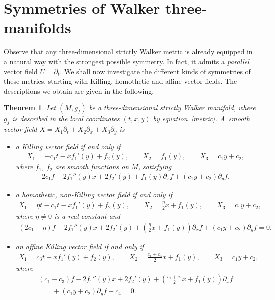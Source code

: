 \documentclass[10pt,a4paper]{amsart}
\numberwithin{equation}{section}
\newtheorem{Theorem}{Theorem}[section]
\begin{document}
\section{Symmetries of Walker three-manifolds}\label{section3}

Observe that any three-dimensional strictly Walker metric is already equipped in a natural way with the strongest possible symmetry. In fact, it admits a {\em parallel} vector f\/ield $U=\partial_t$. We shall now investigate the dif\/ferent kinds of symmetries of these metrics, starting with Killing, homothetic and af\/f\/ine vector f\/ields. The descriptions we obtain are given in the following.

\begin{Theorem}\label{nablasymm}
Let $(M,g_f)$ be a three-dimensional strictly Walker manifold, where $g_f$ is described in the local coordinates $(t,x,y)$ by equation~\eqref{metric}. A~smooth vector field $X=X_1\partial_t+X_2\partial_x+X_3\partial_y$ is
\begin{itemize}\itemsep=0pt
\item[$i)$] a Killing vector field if and only if
\begin{gather}\label{eqKillvector}
X_1=-c_1t-{xf_1 '(y)}+f_2(y),\qquad X_2=f_1(y),\qquad X_3=c_1y+c_2,
\end{gather}
where $f_1$, $f_2$ are smooth functions on $M$, satisfying
\begin{gather}\label{eqKill}
2c_1f-2f_1''(y)x+2f_2 '(y)+f_1(y)\partial_xf+(c_1y+c_2)\partial_yf.
\end{gather}

\item[$ii)$] a homothetic, non-Killing vector field if and only if
\begin{gather}\label{eqHomvector}
X_1=\eta t-c_1t- {xf_1 '(y)}+f_2(y),\qquad X_2=\frac\eta2 x+f_1(y),\qquad X_3=c_1y+c_2,
\end{gather}
where $\eta \neq 0$ is a real constant and
\begin{gather}\label{eqHom}
(2c_1-\eta)f-2f_1''(y)x+2f_2 '(y)+\left(\frac\eta2x+f_1(y)\right)\partial_xf+(c_1y+c_2)\partial_yf=0.
\end{gather}

\item[$iii)$] an affine Killing vector field if and only if
\begin{gather}\label{eqAffvector}
 X_1=c_3t-xf_1 '(y)+f_2(y),\qquad X_2=\frac{c_1+c_3}{2}x+f_1(y),\qquad X_3=c_1y+c_2,
\end{gather}
where
\begin{gather}
(c_1-c_3)f-2f_1 ''(y)x+2f_2 '(y)+\left(\frac{c_1+c_3}{2}x+f_1(y)\right)\partial_xf\nonumber\\
\qquad{} +(c_1y+c_2)\partial_yf+c_4=0.\label{eqAff}
\end{gather}
\end{itemize}
\end{Theorem}
\end{document}
